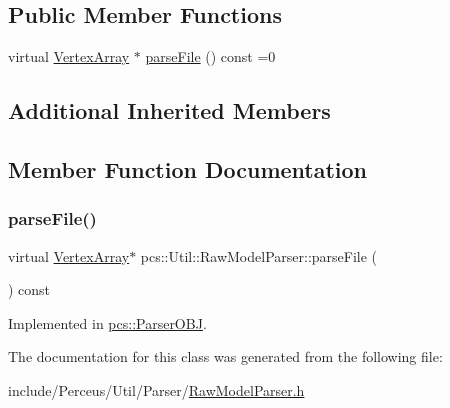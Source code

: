 \subsection*{Public Member Functions}
\begin{DoxyCompactItemize}
\item 
virtual \hyperlink{classpcs_1_1VertexArray}{Vertex\+Array} $\ast$ \hyperlink{classpcs_1_1Util_1_1RawModelParser_a8f14c3221db14dc46ef6c8858690e106}{parse\+File} () const =0
\end{DoxyCompactItemize}
\subsection*{Additional Inherited Members}


\subsection{Member Function Documentation}
\mbox{\label{classpcs_1_1Util_1_1RawModelParser_a8f14c3221db14dc46ef6c8858690e106}} 
\subsubsection{\texorpdfstring{parse\+File()}{parseFile()}}
{\footnotesize\ttfamily virtual \hyperlink{classpcs_1_1VertexArray}{Vertex\+Array}$\ast$ pcs\+::\+Util\+::\+Raw\+Model\+Parser\+::parse\+File (\begin{DoxyParamCaption}{ }\end{DoxyParamCaption}) const\hspace{0.3cm}{\ttfamily [pure virtual]}}



Implemented in \hyperlink{classpcs_1_1ParserOBJ_a9f83ac259feacf8ab83bfd73dc3ebb62}{pcs\+::\+Parser\+O\+BJ}.



The documentation for this class was generated from the following file\+:\begin{DoxyCompactItemize}
\item 
include/\+Perceus/\+Util/\+Parser/\hyperlink{RawModelParser_8h}{Raw\+Model\+Parser.\+h}\end{DoxyCompactItemize}
